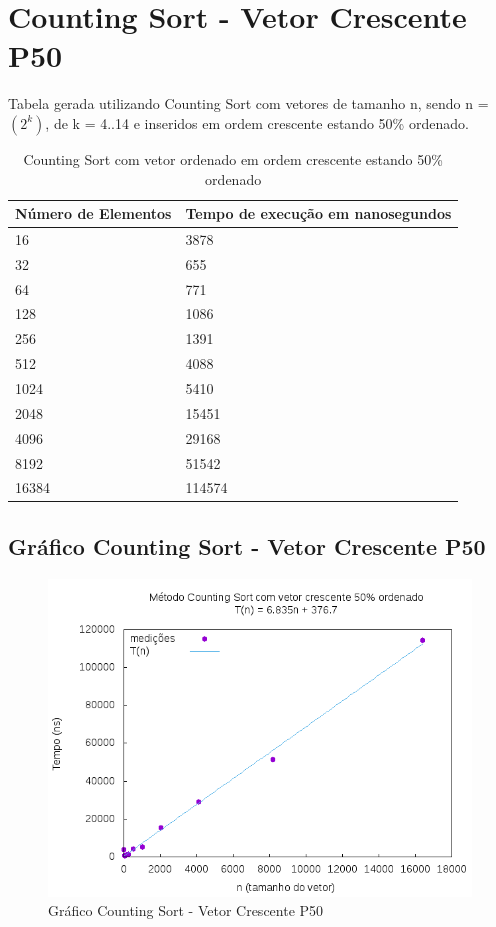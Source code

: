 \documentclass[12pt,a4paper,twoside]{report}
\begin{document}
\section{Counting Sort - Vetor Crescente P50}
Tabela gerada utilizando Counting Sort com vetores de tamanho n, sendo n = $(2^k)$, de k = 4..14 e inseridos em ordem crescente estando 50\% ordenado.
\begin{table}[H]
\centering
\caption{Counting Sort com vetor ordenado em ordem crescente estando 50\% ordenado}
\label{my-label}
\begin{tabular}{|l|l|}
\hline
\multicolumn{1}{|c|}{\textbf{Número de Elementos}} & \multicolumn{1}{c|}{\textbf{Tempo de execução em nanosegundos}} \\ \hline
16 & 3878 \\ \hline
32 & 655 \\ \hline
64 & 771 \\ \hline
128 & 1086 \\ \hline
256 & 1391 \\ \hline
512 & 4088 \\ \hline
1024 & 5410 \\ \hline
2048 & 15451 \\ \hline
4096 & 29168 \\ \hline
8192 & 51542 \\ \hline
16384 & 114574 \\ \hline
\end{tabular}
\end{table}

\subsection{Gráfico Counting Sort - Vetor Crescente P50}
\begin{figure}[H]
    \centering
    \includegraphics[width=0.7\linewidth]{graficos/CountingSort/vIntCrescenteP50/vIntCrescenteP50.png}
  \caption{Gráfico Counting Sort - Vetor Crescente P50}
\end{figure}
\end{document}
